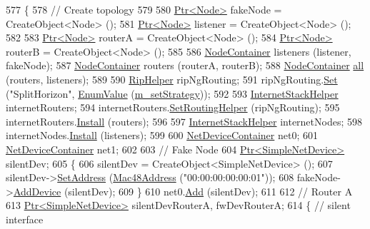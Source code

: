 \begin{DoxyCode}
577 \{
578   \textcolor{comment}{// Create topology}
579 
580   \hyperlink{classns3_1_1Ptr}{Ptr<Node>} fakeNode = CreateObject<Node> ();
581   \hyperlink{classns3_1_1Ptr}{Ptr<Node>} listener = CreateObject<Node> ();
582 
583   \hyperlink{classns3_1_1Ptr}{Ptr<Node>} routerA = CreateObject<Node> ();
584   \hyperlink{classns3_1_1Ptr}{Ptr<Node>} routerB = CreateObject<Node> ();
585 
586   \hyperlink{classns3_1_1NodeContainer}{NodeContainer} listeners (listener, fakeNode);
587   \hyperlink{classns3_1_1NodeContainer}{NodeContainer} routers (routerA, routerB);
588   \hyperlink{classns3_1_1NodeContainer}{NodeContainer} \hyperlink{buildings__pathloss_8m_a00a349297fa58bc80ff5329e25dcfe28}{all} (routers, listeners);
589 
590   \hyperlink{classns3_1_1RipHelper}{RipHelper} ripNgRouting;
591   ripNgRouting.\hyperlink{classns3_1_1RipHelper_a327e3274275469efd9104fcd625efa4d}{Set} (\textcolor{stringliteral}{"SplitHorizon"}, \hyperlink{classns3_1_1EnumValue}{EnumValue} (\hyperlink{classIpv4RipSplitHorizonStrategyTest_aca5223c1caeaa4074b4458ae3ec8e81c}{m\_setStrategy}));
592 
593   \hyperlink{classns3_1_1InternetStackHelper}{InternetStackHelper} internetRouters;
594   internetRouters.\hyperlink{classns3_1_1InternetStackHelper_a3e382c02df022dec79952a7eca8cd5ba}{SetRoutingHelper} (ripNgRouting);
595   internetRouters.\hyperlink{classns3_1_1InternetStackHelper_a6645b412f31283d2d9bc3d8a95cebbc0}{Install} (routers);
596 
597   \hyperlink{classns3_1_1InternetStackHelper}{InternetStackHelper} internetNodes;
598   internetNodes.\hyperlink{classns3_1_1InternetStackHelper_a6645b412f31283d2d9bc3d8a95cebbc0}{Install} (listeners);
599 
600   \hyperlink{classns3_1_1NetDeviceContainer}{NetDeviceContainer} net0;
601   \hyperlink{classns3_1_1NetDeviceContainer}{NetDeviceContainer} net1;
602 
603   \textcolor{comment}{// Fake Node}
604   \hyperlink{classns3_1_1Ptr}{Ptr<SimpleNetDevice>} silentDev;
605   \{
606     silentDev = CreateObject<SimpleNetDevice> ();
607     silentDev->\hyperlink{classns3_1_1SimpleNetDevice_a968ef3e7318bac29d5f1d7d977029af4}{SetAddress} (\hyperlink{classns3_1_1Mac48Address}{Mac48Address} (\textcolor{stringliteral}{"00:00:00:00:00:01"}));
608     fakeNode->\hyperlink{classns3_1_1Node_a42ff83ee1d5d1649c770d3f5b62375de}{AddDevice} (silentDev);
609   \}
610   net0.\hyperlink{classns3_1_1NetDeviceContainer_a7ca8bc1d7ec00fd4fcc63869987fbda5}{Add} (silentDev);
611 
612   \textcolor{comment}{// Router A}
613   \hyperlink{classns3_1_1Ptr}{Ptr<SimpleNetDevice>} silentDevRouterA, fwDevRouterA;
614   \{ \textcolor{comment}{// silent interface}

\end{DoxyCode}
